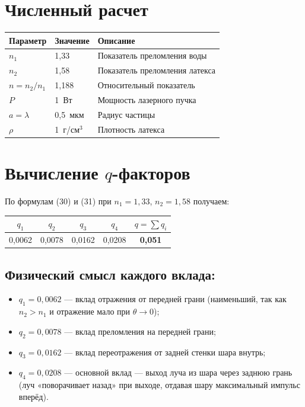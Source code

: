\documentclass[a4paper]{article}
\begin{document}
\section{Численный расчет}

\begin{center}
\begin{tabular}{lll}
\hline
Параметр & Значение & Описание \\
\hline
$n_1$ & 1,33 & Показатель преломления воды \\
$n_2$ & 1,58 & Показатель преломления латекса \\
$n = n_2/n_1$ & 1,188 & Относительный показатель \\
$P$ & 1~Вт & Мощность лазерного пучка \\
$a = \lambda$ & 0,5~мкм & Радиус частицы \\
$\rho$ & 1~г/см$^3$ & Плотность латекса \\
\hline
\end{tabular}
\end{center}

\section*{Вычисление $q$-факторов}

По формулам (30) и (31) при $n_1 = 1{,}33$, $n_2 = 1{,}58$ получаем:

\begin{center}
\begin{tabular}{ccccc}
\hline
$q_1$ & $q_2$ & $q_3$ & $q_4$ & $q = \sum q_i$ \\
\hline
0,0062 & 0,0078 & 0,0162 & 0,0208 & \textbf{0,051} \\
\hline
\end{tabular}
\end{center}

\subsection*{Физический смысл каждого вклада:}
\begin{itemize}
    \item $q_1 = 0{,}0062$ --- вклад отражения от передней грани (наименьший, так как $n_2 > n_1$ и отражение мало при $\theta \to 0$);
    \item $q_2 = 0{,}0078$ --- вклад преломления на передней грани;
    \item $q_3 = 0{,}0162$ --- вклад переотражения от задней стенки шара внутрь;
    \item $q_4 = 0{,}0208$ --- основной вклад --- выход луча из шара через заднюю грань (луч «поворачивает назад» при выходе, отдавая шару максимальный импульс вперёд).
\end{itemize}
\end{document}
